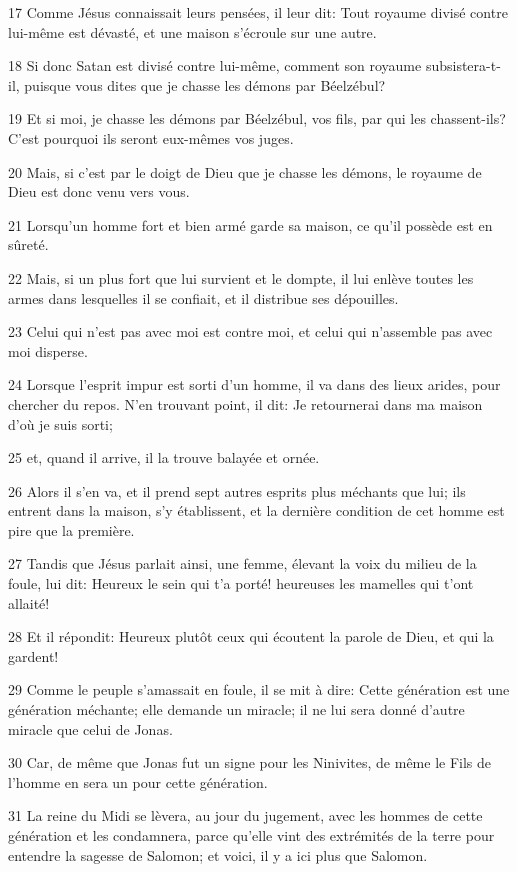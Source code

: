 \par 17 Comme Jésus connaissait leurs pensées, il leur dit: Tout royaume divisé contre lui-même est dévasté, et une maison s'écroule sur une autre.
\par 18 Si donc Satan est divisé contre lui-même, comment son royaume subsistera-t-il, puisque vous dites que je chasse les démons par Béelzébul?
\par 19 Et si moi, je chasse les démons par Béelzébul, vos fils, par qui les chassent-ils? C'est pourquoi ils seront eux-mêmes vos juges.
\par 20 Mais, si c'est par le doigt de Dieu que je chasse les démons, le royaume de Dieu est donc venu vers vous.
\par 21 Lorsqu'un homme fort et bien armé garde sa maison, ce qu'il possède est en sûreté.
\par 22 Mais, si un plus fort que lui survient et le dompte, il lui enlève toutes les armes dans lesquelles il se confiait, et il distribue ses dépouilles.
\par 23 Celui qui n'est pas avec moi est contre moi, et celui qui n'assemble pas avec moi disperse.
\par 24 Lorsque l'esprit impur est sorti d'un homme, il va dans des lieux arides, pour chercher du repos. N'en trouvant point, il dit: Je retournerai dans ma maison d'où je suis sorti;
\par 25 et, quand il arrive, il la trouve balayée et ornée.
\par 26 Alors il s'en va, et il prend sept autres esprits plus méchants que lui; ils entrent dans la maison, s'y établissent, et la dernière condition de cet homme est pire que la première.
\par 27 Tandis que Jésus parlait ainsi, une femme, élevant la voix du milieu de la foule, lui dit: Heureux le sein qui t'a porté! heureuses les mamelles qui t'ont allaité!
\par 28 Et il répondit: Heureux plutôt ceux qui écoutent la parole de Dieu, et qui la gardent!
\par 29 Comme le peuple s'amassait en foule, il se mit à dire: Cette génération est une génération méchante; elle demande un miracle; il ne lui sera donné d'autre miracle que celui de Jonas.
\par 30 Car, de même que Jonas fut un signe pour les Ninivites, de même le Fils de l'homme en sera un pour cette génération.
\par 31 La reine du Midi se lèvera, au jour du jugement, avec les hommes de cette génération et les condamnera, parce qu'elle vint des extrémités de la terre pour entendre la sagesse de Salomon; et voici, il y a ici plus que Salomon.
